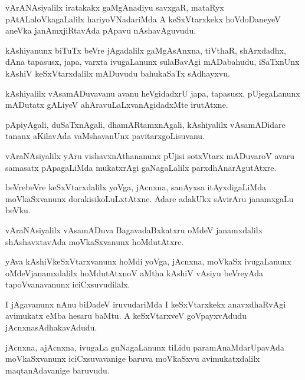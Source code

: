 \documentclass{article}
\begin{document}
\begin{mn}
vArANAsiyalilx iratakakx gaMgAnadiyu savxgaR, mataRyx pAtALaloVkagaLalilx hariyoVNadariMda A 
keSxVtarxkekx hoVdoDaneyeV aneVka janAmxjiRtavAda pApavu nAshavAguvudu.
\end{mn}

\begin{mn}
kAshiyanunx biTuTx beVre jAgadalilx gaMgAsAnxna, tiVthaR, shArxdadhx, dAna tapasusx, japa, varxta 
ivugaLanunx sulaBavAgi mADabahudu, iSaTxnUnx kAshiV keSxVtarxdalilx mADuvudu bahukaSaTx sAdhayxvu.
\end{mn}

\begin{mn}
kAshiyalilx vAsamADuvavanu avanu heVgidadxrU japa, tapasusx, pUjegaLanunx mADutatx gALiyeV 
ahAravuLaLxvanAgidadxMte irutAtxne.
\end{mn}

\begin{mn}
pApiyAgali, duSaTxnAgali, dhamARtamxnAgali, kAshiyalilx vAsamADidare tananx aKilavAda vaMshavanUnx 
pavitarxgoLisuvanu.
\end{mn}

\begin{mn}
vAraNAsiyalilx yAru vishavxnAthananunx pUjisi sotxVtarx mADuvaroV avaru samasatx pApagaLiMda 
mukatxrAgi gaNagaLalilx parxdhAnarAgutAtxre.
\end{mn}

\begin{mn}
beVrebeVre keSxVtarxdalilx yoVga, jAcnxna, sanAyxsa itAyxdigaLiMda moVkaSxvanunx 
dorakisikoLuLxtAtxne. Adare adakUkx sAvirAru janamxgaLu beVku.
\end{mn}

\begin{mn}
vAraNAsiyalilx vAsamADuva BagavadaBxkatxru oMdeV janamxdalilx shAshavxtavAda moVkaSxvanunx 
hoMdutAtxre.
\end{mn}

\begin{mn}
yAva kAshiVkeSxVtarxvanunx hoMdi yoVga, jAcnxna, moVkaSx ivugaLanunx oMdeVjanamxdalilx 
hoMdutAtxnoV aMtha kAshiV vAsiyu beVreyAda tapoVvanavanunx iciCxsuvudilalx.
\end{mn}

\begin{mn}
I jAgavanunx nAnu biDadeV iruvudariMda I keSxVtarxkekx anavxdhaRvAgi avimukatx eMba hesaru baMtu.
A keSxVtarxveV goVpayxvAdudu jAcnxnasAdhakavAdudu.
\end{mn}

\begin{mn}
jAcnxna, ajAcnxna, ivugaLa guNagaLanunx tiLidu paramAnaMdarUpavAda moVkaSxvanunx 
iciCxsuvavanige baruva moVkaSxvu avimukatxdalilx maqtanAdavanige baruvudu.
\end{mn}
\end{document}
